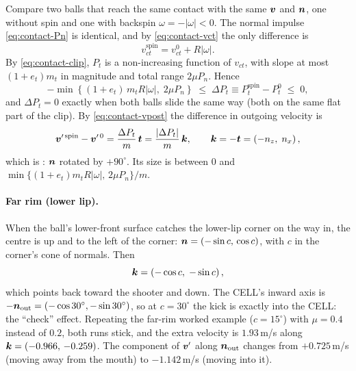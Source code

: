 Compare two balls that reach the same contact with the same $\bm{v}$ and $\bm{n}$, one
without spin and one with backspin $\omega=-|\omega|<0$. The normal impulse \eqref{eq:contact-Pn} is
identical, and by \eqref{eq:contact-vct} the only difference is
\begin{equation}
  v_{ct}^{\text{spin}} = v_{ct}^{0} + R|\omega| .
  \label{eq:contact-vct-shift}
\end{equation}
By \eqref{eq:contact-clip}, $P_t$ is a non-increasing function of $v_{ct}$, with slope at most
$(1+e_t)m_t$ in magnitude and total range $2\mu P_n$. Hence
\begin{equation}
  -\min\!\left\{(1+e_t)\,m_t R|\omega|,\; 2\mu P_n\right\}
  \;\le\; \Delta P_t \equiv P_t^{\text{spin}}-P_t^{0} \;\le\; 0 ,
  \label{eq:contact-dPt-bound}
\end{equation}
and $\Delta P_t=0$ exactly when both balls slide the same way (both on the same flat part of the
clip). By \eqref{eq:contact-vpost} the difference in outgoing velocity is
\begin{equation}
  \bm{v}'^{\,\text{spin}}-\bm{v}'^{\,0} = \frac{\Delta P_t}{m}\,\bm{t}
  = \frac{|\Delta P_t|}{m}\,\bm{k},
  \qquad
  \bm{k} = -\bm{t} = \left(-n_z,\; n_x\right),
  \label{eq:contact-kick}
\end{equation}
which is : $\bm{n}$ rotated by $+90^\circ$. Its size is between
$0$ and $\min\{(1+e_t)m_tR|\omega|,\,2\mu P_n\}/m$.

\paragraph{Far rim (lower lip).}
When the ball's lower-front surface catches the lower-lip corner on the way in, the centre is
up and to the left of the corner: $\bm{n}=(-\sin c,\,\cos c)$, with $c$ in the corner's cone
of normals. Then
\begin{equation}
  \bm{k} = \left(-\cos c,\; -\sin c\right),
  \label{eq:contact-kick-far}
\end{equation}
which points back toward the shooter and down. The CELL's inward axis is
$-\bm{n}_{\text{out}}=(-\cos30^\circ,-\sin30^\circ)$, so at $c=30^\circ$\derived{} the kick is
exactly into the CELL: the ``check'' effect. Repeating the far-rim worked example
($c=15^\circ$\assumed) with $\mu=0.4$\assumed{} instead of $0.2$\assumed, both runs stick, and the extra velocity is
$1.93$\,\unit{m/s}\predicted{} along $\bm{k}=(-0.966,\,-0.259)$\derived. The component of
$\bm{v}'$ along $\bm{n}_{\text{out}}$ changes from $+0.725$\,\unit{m/s}\predicted{} (moving
away from the mouth) to $-1.142$\,\unit{m/s}\predicted{} (moving into it).

